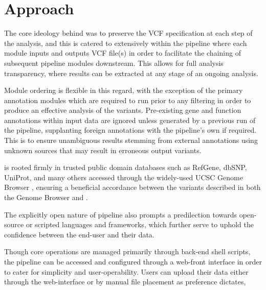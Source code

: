 
\section{Approach}

The core ideology behind \app was to preserve the VCF specification at each step of the analysis, and this is catered to extensively within the pipeline where each module inputs and outputs VCF file(s) in order to facilitate the chaining of subsequent pipeline modules downstream. This allows for full analysis transparency, where results can be extracted at any stage of an ongoing analysis. 

Module ordering is flexible in this regard, with the exception of the primary annotation modules which are required to run prior to any filtering in order to produce an effective analysis of the variants. Pre-existing gene and function annotations within input data are ignored unless generated by a previous run of the \app pipeline, supplanting foreign annotations with the pipeline's own if required. This is to ensure unambiguous results stemming from external annotations using unknown sources that may result in erroneous output variants.

\app is rooted firmly in trusted public domain databases such as RefGene, dbSNP, UniProt, and many others accessed through the widely-used UCSC Genome Browser \citep{karolchik2003ucsc}, ensuring a beneficial accordance between the variants described in both the Genome Browser and \app.

The explicitly open nature of pipeline also prompts a predilection towards open-source or scripted languages and frameworks, which further serve to uphold the confidence between the end-user and their data.

Though core operations are managed primarily through back-end shell scripts, the pipeline can be accessed and configured through a web-front interface in order to cater for simplicity and user-operability. Users can upload their data either through the web-interface or by manual file placement as preference dictates,
